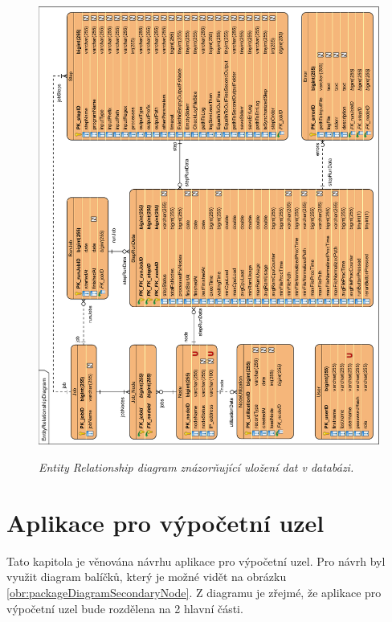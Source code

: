 \begin{figure}[H]
\begin{center}
    \scalebox{0.5}
    {
        \includegraphics{images/EntityRelationshipDiagram.pdf}
    }
    \caption{\label{obr:ER_diagram} {\it Entity Relationship diagram znázorňující uložení dat v databázi.}}
\end{center}
\end{figure}


\section{Aplikace pro výpočetní uzel}
\label{section:secondaryNodeAppDesign}

Tato kapitola je věnována návrhu aplikace pro výpočetní uzel. Pro návrh byl využit diagram balíčků, který je možné vidět na obrázku \ref{obr:packageDiagramSecondaryNode}. Z diagramu je zřejmé, že aplikace pro výpočetní uzel bude rozdělena na 2 hlavní části. 

